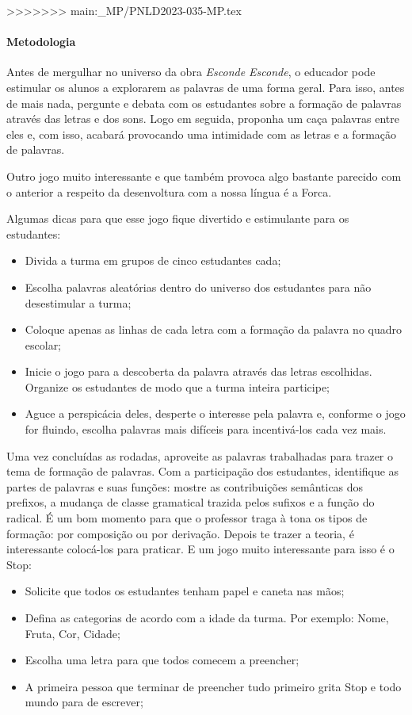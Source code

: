 \documentclass[11pt]{extarticle}
\begin{document}
>>>>>>> main:_MP/PNLD2023-035-MP.tex

\paragraph{Metodologia} Antes de mergulhar no universo da obra \textit{Esconde Esconde}, o educador pode estimular os alunos a explorarem as palavras de uma forma geral. Para isso, antes de mais nada, pergunte e debata com os estudantes sobre a formação de palavras através das letras e dos sons. Logo em seguida, proponha um caça palavras entre eles e, com isso, acabará provocando uma intimidade com as letras e a formação de palavras. 

Outro jogo muito interessante e que também provoca algo bastante parecido com o anterior a respeito da desenvoltura com a nossa língua é a Forca. 

Algumas dicas para que esse jogo fique divertido e estimulante para os estudantes: 


\begin{itemize}
\item Divida a turma em grupos de cinco estudantes cada;
\item Escolha palavras aleatórias dentro do universo dos estudantes para não desestimular a turma;
\item Coloque apenas as linhas de cada letra com a formação da palavra no quadro escolar; 
\item Inicie o jogo para a descoberta da palavra através das letras escolhidas. Organize os estudantes de modo que a turma inteira participe;
\item Aguce a perspicácia deles, desperte o interesse pela palavra e, conforme o jogo for fluindo, escolha palavras mais difíceis para incentivá-los cada vez mais.

\end{itemize}

Uma vez concluídas as rodadas, aproveite as palavras trabalhadas para trazer o tema de formação de palavras. Com a participação dos estudantes, identifique as partes de palavras e suas funções: mostre as contribuições semânticas dos prefixos, a mudança de classe gramatical trazida pelos sufixos e a função do radical. É um bom momento para que o professor traga à tona os tipos de formação: por composição ou por derivação. Depois te trazer a teoria, é interessante colocá-los para praticar. E um jogo muito interessante para isso é o Stop:

\begin{itemize}
\item Solicite que todos os estudantes tenham papel e caneta nas mãos;
\item Defina as categorias de acordo com a idade da turma. Por exemplo: Nome, Fruta, Cor, Cidade;
\item Escolha uma letra para que todos comecem a preencher;
\item A primeira pessoa que terminar de preencher tudo primeiro grita Stop e todo mundo para de escrever;
\end{itemize}
\end{document}
